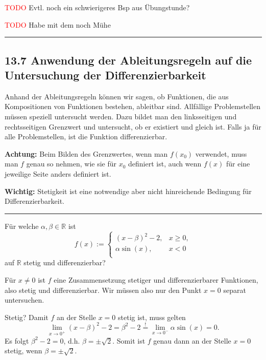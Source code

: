 \documentclass[a4paper,landscape,8pt]{extarticle}
\newcommand{\R}{\mathbb{R}}
\newcommand{\todo}{\textcolor{red}{TODO }}
\newcommand{\sep}{\vspace{5pt}\noindent\hrule\vspace{5pt}}
\newcommand{\Achtung}{\textbf{Achtung: }}
\newcommand{\Wichtig}{\textbf{Wichtig: }}
\begin{document}
\begin{multicols*}{4}
\begin{warmup}
\todo Evtl. noch ein schwierigeres Bsp aus Übungstunde?

\todo Habe mit dem noch Mühe
\end{warmup}

\sep

\subsection{13.7 Anwendung der Ableitungsregeln auf die Untersuchung der
Differenzierbarkeit}

Anhand der Ableitungsregeln können wir sagen, ob Funktionen, die aus
Kompositionen von Funktionen bestehen, ableitbar sind. Allfällige Problemstellen
müssen speziell untersucht werden. Dazu bildet man den linksseitigen und
rechtsseitigen Grenzwert und untersucht, ob er existiert und gleich ist. Falls
ja für alle Problemstellen, ist die Funktion differenzierbar.

\Achtung Beim Bilden des Grenzwertes, wenn man $f(x_0)$ verwendet, muss man $f$
genau so nehmen, wie sie für $x_0$ definiert ist, auch wenn $f(x)$ für eine
jeweilige Seite anders definiert ist.

\Wichtig Stetigkeit ist eine notwendige aber nicht hinreichende Bedingung für
Differenzierbarkeit.


\begin{warmup}

\sep

\Bsp Für welche $\alpha,\beta\in\R$ ist
\[
f(x):=\begin{cases}
(x-\beta)^2-2, & x\geq 0,\\
\alpha \sin(x), & x< 0\\
\end{cases}
\]
auf $\R$ stetig und differenzierbar?

Für $x\neq 0$ ist $f$ eine Zusammensetzung stetiger und differenzierbarer
Funktionen, also stetig und differenzierbar. Wir müssen also nur den Punkt $x=0$
separat untersuchen.

Stetig? Damit $f$ an der Stelle $x=0$ stetig ist, muss gelten
\[
\lim_{x\to 0^+} (x-\beta)^2 -2 = \beta^2 - 2 \stackrel{!}{=} \lim_{x\to 0^-}
\alpha \sin(x) = 0.
\]
Es folgt $\beta^2-2=0$, d.h. $\beta=\pm\sqrt{2}$. Somit ist $f$ genau dann an
der Stelle $x=0$ stetig, wenn $\beta=\pm\sqrt{2}$.


\end{warmup}
\end{multicols*}
\end{document}
